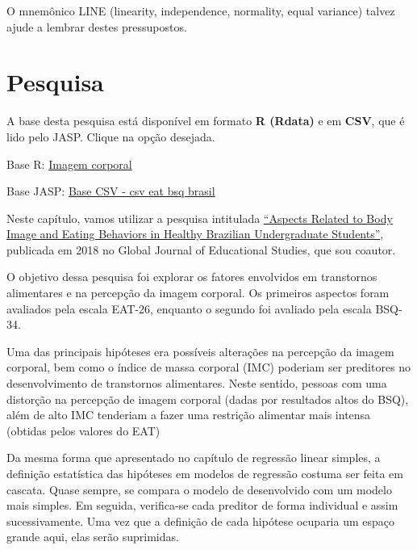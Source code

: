 \documentclass[
]{book}
\newenvironment{base}{
  \definecolor{shadecolor}{rgb}{0.972,0.972,0.972}  %
  \color{black}
  \begin{shaded}}
 {\end{shaded}}
\begin{document}
O mnemônico LINE (linearity, independence, normality, equal variance) talvez ajude a lembrar destes pressupostos.

\hypertarget{pesquisa-10}{%
\section{Pesquisa}\label{pesquisa-10}}

\begin{base}
A base desta pesquisa está disponível em formato \textbf{R (Rdata)} e em \textbf{CSV}, que é lido pelo JASP. Clique na opção desejada.

Base R: \href{https://github.com/anovabr/mqt/raw/master/bases/Base\%20R\%20-\%20imagem\%20corporal.RData}{Imagem corporal}

Base JASP: \href{https://github.com/anovabr/mqt/raw/master/bases/bases_csv_jasp.zip}{Base CSV - csv eat bsq brasil}

\end{base}

Neste capítulo, vamos utilizar a pesquisa intitulada \href{https://www.researchgate.net/publication/323729370_Aspects_Related_to_Body_Image_and_Eating_Behaviors_in_Healthy_Brazilian_Undergraduate_Students}{``Aspects Related to Body Image and Eating Behaviors in Healthy Brazilian Undergraduate Students''}, publicada em 2018 no Global Journal of Educational Studies, que sou coautor.

O objetivo dessa pesquisa foi explorar os fatores envolvidos em transtornos alimentares e na percepção da imagem corporal. Os primeiros aspectos foram avaliados pela escala EAT-26, enquanto o segundo foi avaliado pela escala BSQ-34.

Uma das principais hipóteses era possíveis alterações na percepção da imagem corporal, bem como o índice de massa corporal (IMC) poderiam ser preditores no desenvolvimento de transtornos alimentares. Neste sentido, pessoas com uma distorção na percepção de imagem corporal (dadas por resultados altos do BSQ), além de alto IMC tenderiam a fazer uma restrição alimentar mais intensa (obtidas pelos valores do EAT)

Da mesma forma que apresentado no capítulo de regressão linear simples, a definição estatística das hipóteses em modelos de regressão costuma ser feita em cascata. Quase sempre, se compara o modelo de desenvolvido com um modelo mais simples. Em seguida, verifica-se cada preditor de forma individual e assim sucessivamente. Uma vez que a definição de cada hipótese ocuparia um espaço grande aqui, elas serão suprimidas.
\end{document}
